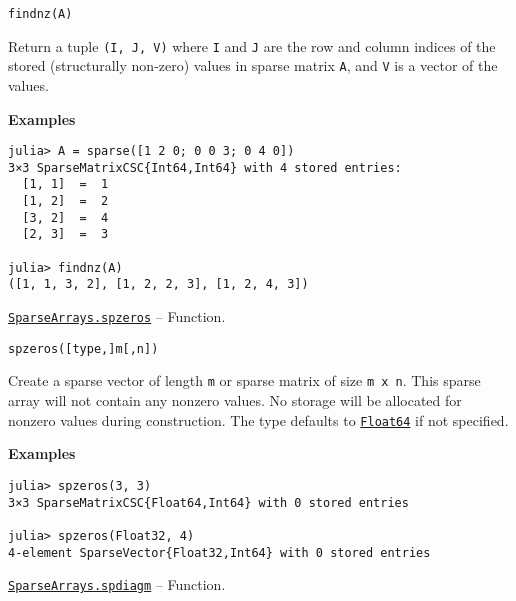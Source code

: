 \begin{adjustwidth}{2em}{0pt}


\begin{verbatim}
findnz(A)
\end{verbatim}

Return a tuple \texttt{(I, J, V)} where \texttt{I} and \texttt{J} are the row and column indices of the stored ({\textquotedbl}structurally non-zero{\textquotedbl}) values in sparse matrix \texttt{A}, and \texttt{V} is a vector of the values.

\textbf{Examples}


\begin{verbatim}
julia> A = sparse([1 2 0; 0 0 3; 0 4 0])
3×3 SparseMatrixCSC{Int64,Int64} with 4 stored entries:
  [1, 1]  =  1
  [1, 2]  =  2
  [3, 2]  =  4
  [2, 3]  =  3

julia> findnz(A)
([1, 1, 3, 2], [1, 2, 2, 3], [1, 2, 4, 3])
\end{verbatim}



\end{adjustwidth}
\hypertarget{10306793690101482847}{} 
\hyperlink{10306793690101482847}{\texttt{SparseArrays.spzeros}}  -- {Function.}

\begin{adjustwidth}{2em}{0pt}


\begin{verbatim}
spzeros([type,]m[,n])
\end{verbatim}

Create a sparse vector of length \texttt{m} or sparse matrix of size \texttt{m x n}. This sparse array will not contain any nonzero values. No storage will be allocated for nonzero values during construction. The type defaults to \hyperlink{5027751419500983000}{\texttt{Float64}} if not specified.

\textbf{Examples}


\begin{verbatim}
julia> spzeros(3, 3)
3×3 SparseMatrixCSC{Float64,Int64} with 0 stored entries

julia> spzeros(Float32, 4)
4-element SparseVector{Float32,Int64} with 0 stored entries
\end{verbatim}



\end{adjustwidth}
\hypertarget{10407455986460913397}{} 
\hyperlink{10407455986460913397}{\texttt{SparseArrays.spdiagm}}  -- {Function.}

